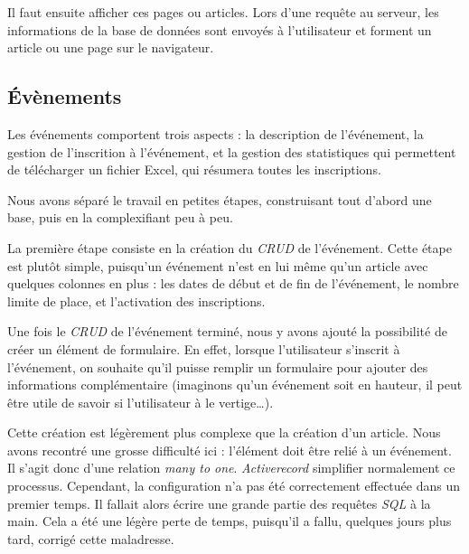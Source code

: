 \documentclass[a4paper,11pt]{article}
\begin{document}
Il faut ensuite afficher ces pages ou articles. Lors d'une requête au serveur, les informations de la base de données sont envoyés à l'utilisateur et forment un article ou une page sur le navigateur.

\subsection{Évènements}
Les événements comportent trois aspects : la description de l'événement, la gestion de l'inscrition à l'événement, et la gestion des statistiques qui permettent de télécharger un fichier Excel, qui résumera toutes les inscriptions. 

Nous avons séparé le travail en petites étapes, construisant tout d'abord une base, puis en la complexifiant peu à peu. 

\medbreak

La première étape consiste en la création du \textit{CRUD} de l'événement. Cette étape est plutôt simple, puisqu'un événement n'est en lui même qu'un article avec quelques colonnes en plus : les dates de début et de fin de l'événement, le nombre limite de place, et l'activation des inscriptions. 

\medbreak
Une fois le \textit{CRUD} de l'événement terminé, nous y avons ajouté la possibilité de créer un élément de formulaire. En effet, lorsque l'utilisateur s'inscrit à l'événement, on souhaite qu'il puisse remplir un formulaire pour ajouter des informations complémentaire (imaginons qu'un événement soit en hauteur, il peut être utile de savoir si l'utilisateur à le vertige\dots). 

Cette création est légèrement plus complexe que la création d'un article. Nous avons recontré une grosse difficulté ici : l'élément doit être relié à un événement. Il s'agit donc d'une relation \textit{many to one}. \textit{Activerecord} simplifier normalement ce processus. Cependant, la configuration n'a pas été correctement effectuée dans un premier temps. Il fallait alors écrire une grande partie des requêtes \textit{SQL} à la main. Cela a été une légère perte de temps, puisqu'il a fallu, quelques jours plus tard, corrigé cette maladresse. 
\end{document}
